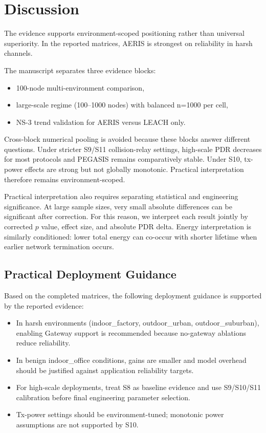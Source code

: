 ﻿\documentclass[sensors,article,submit,moreauthors,pdftex]{Definitions/mdpi}
\begin{document}
\section{Discussion}
The evidence supports environment-scoped positioning rather than universal superiority. In the reported matrices, AERIS is strongest on reliability in harsh channels.

The manuscript separates three evidence blocks:
\begin{itemize}
\item 100-node multi-environment comparison,
\item large-scale regime (100--1000 nodes) with balanced n=1000 per cell,
\item NS-3 trend validation for AERIS versus LEACH only.
\end{itemize}
Cross-block numerical pooling is avoided because these blocks answer different questions. Under stricter S9/S11 collision-relay settings, high-scale PDR decreases for most protocols and PEGASIS remains comparatively stable. Under S10, tx-power effects are strong but not globally monotonic. Practical interpretation therefore remains environment-scoped.

Practical interpretation also requires separating statistical and engineering significance. At large sample sizes, very small absolute differences can be significant after correction. For this reason, we interpret each result jointly by corrected $p$ value, effect size, and absolute PDR delta. Energy interpretation is similarly conditioned: lower total energy can co-occur with shorter lifetime when earlier network termination occurs.

\subsection*{Practical Deployment Guidance}
Based on the completed matrices, the following deployment guidance is supported by the reported evidence:
\begin{itemize}
\item In harsh environments (indoor\_factory, outdoor\_urban, outdoor\_suburban), enabling Gateway support is recommended because no-gateway ablations reduce reliability.
\item In benign indoor\_office conditions, gains are smaller and model overhead should be justified against application reliability targets.
\item For high-scale deployments, treat S8 as baseline evidence and use S9/S10/S11 calibration before final engineering parameter selection.
\item Tx-power settings should be environment-tuned; monotonic power assumptions are not supported by S10.
\end{itemize}
\end{document}
